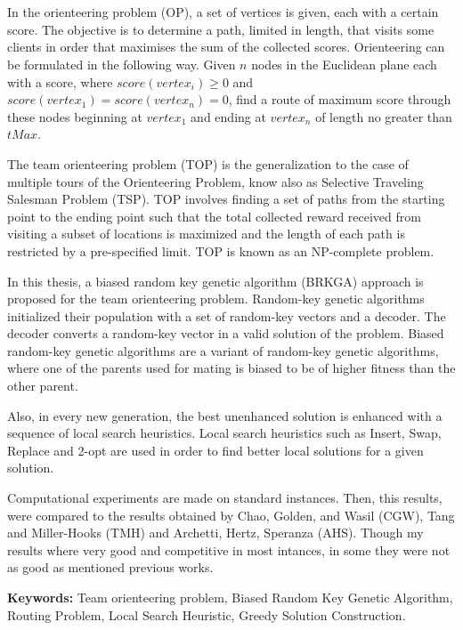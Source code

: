 
\chapter*{\tituloAbstractEn}

\noindent In the orienteering problem (OP), a set of vertices is given, each with a certain score. The objective is to determine a path, limited in length, that visits some clients in order that maximises the sum of the collected scores. Orienteering can be formulated in the following way. Given $n$ nodes in the Euclidean plane each with a score, where $score(vertex_i) \geq 0$ and $score(vertex_1) = score(vertex_n) = 0$, find a route of maximum score through these nodes beginning at $vertex_1$ and ending at $vertex_n$ of length no greater than $tMax$.

\bigskip

The team orienteering problem (TOP) is the generalization to the case of multiple tours of the Orienteering Problem, know also as Selective Traveling Salesman Problem (TSP). TOP involves finding a set of paths from the starting point to the ending point such that the total collected reward received from visiting a subset of locations is maximized and the length of each path is restricted by a pre-specified limit. TOP is known as an NP-complete problem.

\bigskip

In this thesis, a biased random key genetic algorithm (BRKGA) approach is proposed for the team orienteering problem. Random-key genetic algorithms initialized their population with a set of random-key vectors and a decoder. The decoder converts a random-key vector in a valid solution of the problem. Biased random-key genetic algorithms are a variant of random-key genetic algorithms, where one of the parents used for mating is biased to be of higher fitness than the other parent.

\bigskip

Also, in every new generation, the best unenhanced solution is enhanced with a sequence of local search heuristics. Local search heuristics such as Insert, Swap, Replace and 2-opt are used in order to find better local solutions for a given solution. 

\bigskip

Computational experiments are made on standard instances. Then, this results, were compared to the results obtained by Chao, Golden, and Wasil (CGW), Tang and Miller-Hooks (TMH) and Archetti, Hertz, Speranza (AHS). Though my results where very good and competitive in most intances, in some they were not as good as mentioned previous works.

\bigskip

\noindent\textbf{Keywords:} Team orienteering problem, Biased Random Key Genetic Algorithm, Routing Problem, Local Search Heuristic, Greedy Solution Construction.